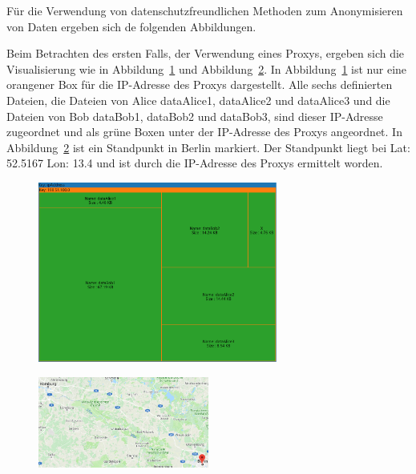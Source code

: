 \documentclass[
    fontsize=12pt,
    headings=small,
    parskip=half,           %
    bibliography=totoc,
    numbers=noenddot,       %
    open=any,               %
    ]{scrreprt}
\begin{document}
Für die Verwendung von datenschutzfreundlichen Methoden zum Anonymisieren von Daten ergeben sich de folgenden Abbildungen.

Beim Betrachten des ersten Falls, der Verwendung eines Proxys, ergeben sich die Visualisierung wie in Abbildung~\ref{fig:PIpTM} und Abbildung~\ref{fig:PIpM}.
In Abbildung~\ref{fig:PIpTM} ist nur eine orangener Box für die IP-Adresse des Proxys dargestellt.
Alle sechs definierten Dateien, die Dateien von Alice dataAlice1, dataAlice2 und dataAlice3 und die Dateien von Bob dataBob1, dataBob2 und dataBob3, sind dieser IP-Adresse zugeordnet und als grüne Boxen unter der IP-Adresse des Proxys angeordnet.
In Abbildung~\ref{fig:PIpM} ist ein Standpunkt in Berlin markiert.
Der Standpunkt liegt bei \ac{Lat}: 52.5167 \ac{Lon}: 13.4 und ist durch die IP-Adresse des Proxys ermittelt worden. 

\begin{figure}[H]
\includegraphics[width=0.7\textwidth]{../pic/IP-Proxy-SetB-tree3.PNG}
\label{fig:PIpTM}
\end{figure}

\begin{figure}[H]
\includegraphics[width=0.5\textwidth , height=0.2\textheight]{../pic/IP-Proxy-SetB.PNG}
\label{fig:PIpM}
\end{figure}
\end{document}
